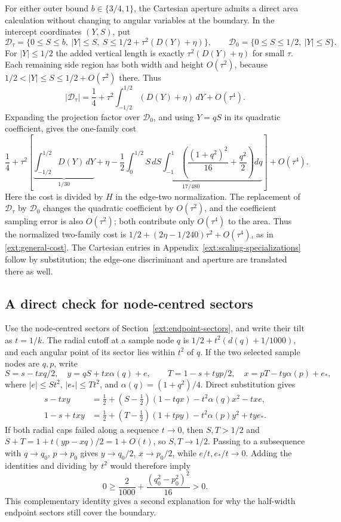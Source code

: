 For either outer bound $b\in\{3/4,1\}$, the Cartesian aperture admits a
direct area calculation without changing to angular variables at the
boundary.  In the intercept coordinates $(Y,S)$, put
\[
 \mathcal D_\tau=\{0\le S\le b,\ |Y|\le S,
            \ S\le1/2+\tau^2(D(Y)+\eta)\},\qquad
 \mathcal D_0=\{0\le S\le1/2,\ |Y|\le S\}.
\]
For $|Y|\le1/2$ the added vertical length is exactly
$\tau^2(D(Y)+\eta)$ for small $\tau$.  Each remaining side region has
both width and height $O(\tau^2)$, because
$1/2<|Y|\le S\le1/2+O(\tau^2)$ there.  Thus
\[
 |\mathcal D_\tau|=\frac14+
 \tau^2\int_{-1/2}^{1/2}(D(Y)+\eta)\,dY+O(\tau^4).
\]
Expanding the projection factor over $\mathcal D_0$, and using
$Y=qS$ in its quadratic coefficient, gives the one-family cost
\[
 \frac14+\tau^2\left[
 \underbrace{\int_{-1/2}^{1/2}D(Y)\,dY}_{1/30}+\eta
 -\underbrace{\frac12\int_0^{1/2}S\,dS
   \int_{-1}^1\left(\frac{(1+q^2)^2}{16}+\frac{q^2}{2}\right)dq}_{17/480}
 \right]+O(\tau^4).
\]
Here the cost is divided by $H$ in the edge-two normalization.
The replacement of $\mathcal D_\tau$ by $\mathcal D_0$ changes the
quadratic coefficient by $O(\tau^2)$, and the coefficient sampling
error is also $O(\tau^2)$; both contribute only $O(\tau^4)$ to the
area.  Thus the normalized two-family cost is
$1/2+(2\eta-1/240)\tau^2+O(\tau^4)$, as in
\eqref{ext:general-cost}.  The Cartesian entries in
Appendix~\ref{ext:scaling-specializations} follow by substitution; the
edge-one discriminant and aperture are translated there as well.

\subsection{A direct check for node-centred sectors}
\label{ext:endpoint-direct}

Use the node-centred sectors of Section~\ref{ext:endpoint-sectors},
and write their tilt as $t=1/k$.  The radial cutoff at a sample node $q$
is $1/2+t^2(d(q)+1/1000)$, and each angular point of its sector lies
within $t^2$ of $q$.  If the two selected sample nodes are $q,p$, write
\[
 S=s-txq/2,\quad y=qS+tx\alpha(q)+e,
 \qquad
 T=1-s+typ/2,\quad x=pT-ty\alpha(p)+e_*,
\]
where $|e|\le St^2$, $|e_*|\le Tt^2$, and
$\alpha(q)=(1+q^2)/4$.  Direct substitution gives
\begin{align*}
 s-txy&=\tfrac12+(S-\tfrac12)(1-tqx)-t^2\alpha(q)x^2-txe,\\
 1-s+txy&=\tfrac12+(T-\tfrac12)(1+tpy)-t^2\alpha(p)y^2+tye_*.
\end{align*}
If both radial caps failed along a sequence $t\to0$, then $S,T>1/2$ and
$S+T=1+t(yp-xq)/2=1+O(t)$, so $S,T\to1/2$.
Passing to a subsequence with $q\to q_0$, $p\to p_0$ gives
$y\to q_0/2$, $x\to p_0/2$, while $e/t,e_*/t\to0$.
Adding the identities and dividing by $t^2$ would therefore imply
\[
 0\ge\frac2{1000}+\frac{(q_0^2-p_0^2)^2}{16}>0.
\]
This complementary identity gives a second explanation for why the
half-width endpoint sectors still cover the boundary.
